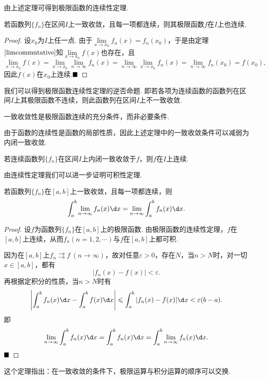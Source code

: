 由上述定理可得到极限函数的连续性定理.
\begin{theorem}[连续性]
	若函数列$\{f_n\}$在区间$I$上一致收敛，且每一项都连续，则其极限函数$f$在$I$上也连续.
\end{theorem}
\begin{proof}
	设$x_0$为$I$上任一点. 由于$\lim\limits_{x\to x_0}f_n(x)=f_n(x_0)$，于是由定理$\ref{limcommutative}$知$\lim\limits_{x\to x_0}f(x)$也存在，且
	$$\lim\limits_{x\to x_0}f(x)=\lim\limits_{x\to x_0}\lim\limits_{n\to\infty}f_n(x)=\lim\limits_{n\to\infty}\lim\limits_{x\to x_0}f_n(x)=\lim\limits_{n\to\infty}f_n(x_0)=f(x_0),$$
	因此$f(x)$在$x_0$上连续.$\hfill\blacksquare$
\end{proof}
\begin{remark}
	我们可以得到极限函数连续性定理的逆否命题. 即若各项为连续函数的函数列在区间$I$上其极限函数不连续，则此函数列在区间$I$上不一致收敛.
\end{remark}
\begin{remark}
	一致收敛性是极限函数连续的充分条件，而非必要条件.
\end{remark}
由于函数的连续性是函数的局部性质，因此上述定理中的一致收敛条件可以减弱为内闭一致收敛.
\begin{corollary}
	若连续函数列$\{f_n\}$在区间$I$上内闭一致收敛于$f$，则$f$在$I$上连续.
\end{corollary}
由连续性定理我们可以进一步证明可积性定理.
\begin{theorem}[可积性]
	若函数列$\{f_n\}$在$\left[a,b\right]$上一致收敛，且每一项都连续，则
	$$\int_{a}^{b}\lim\limits_{n\to\infty}f_n(x)\d x=\lim\limits_{n\to\infty}\int_{a}^{b}f_n(x)\d x.$$
\end{theorem}
\begin{proof}
	设$f$为函数列$\{f_n\}$在$\left[a,b\right]$上的极限函数. 由极限函数的连续性定理，$f$在$\left[a,b\right]$上连续，从而$f_n(n=1,2,\cdots)$与$f$在$\left[a,b\right]$上都可积.
	
	因为在$\left[a,b\right]$上$f_n\rightrightarrows f\ (n\to\infty)$，故对任意$\varepsilon>0$，存在$N$，当$n>N$时，对一切$x\in \left[a,b\right]$，都有
	$$|f_n(x)-f(x)|<\varepsilon.$$
	再根据定积分的性质，当$n>N$时有
	$$\left|\int_{a}^{b}f_n(x)\d x-\int_{a}^{b}f(x)\d x\right|\leqslant\int_{a}^{b}|f_n(x)-f(x)|\d x<\varepsilon(b-a).$$
	即
	$$\lim\limits_{n\to\infty}\int_{a}^{b}f_n(x)\d x=\int_{a}^{b}f_n(x)\d x=\int_{a}^{b}\lim\limits_{n\to\infty}f_n(x)\d x.$$
	$\hfill\blacksquare$
\end{proof}
\begin{remark}
	这个定理指出：在一致收敛的条件下，极限运算与积分运算的顺序可以交换.
\end{remark}
